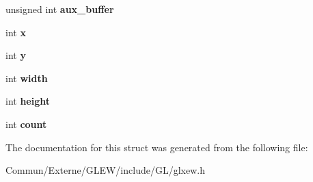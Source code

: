 \begin{DoxyCompactItemize}
\item 
unsigned int {\bfseries aux\+\_\+buffer}\hypertarget{struct_g_l_x_pbuffer_clobber_event_a13193b6e7e3e52b15f754fe91403b7ec}{}\label{struct_g_l_x_pbuffer_clobber_event_a13193b6e7e3e52b15f754fe91403b7ec}

\item 
int {\bfseries x}\hypertarget{struct_g_l_x_pbuffer_clobber_event_a8f0a7162a033c89ee94ce535580dbc32}{}\label{struct_g_l_x_pbuffer_clobber_event_a8f0a7162a033c89ee94ce535580dbc32}

\item 
int {\bfseries y}\hypertarget{struct_g_l_x_pbuffer_clobber_event_a69eb7ac60d36ac3ec4550ac206cfc61f}{}\label{struct_g_l_x_pbuffer_clobber_event_a69eb7ac60d36ac3ec4550ac206cfc61f}

\item 
int {\bfseries width}\hypertarget{struct_g_l_x_pbuffer_clobber_event_aaca375fecb872c73c60cd5d0bfc7c7a5}{}\label{struct_g_l_x_pbuffer_clobber_event_aaca375fecb872c73c60cd5d0bfc7c7a5}

\item 
int {\bfseries height}\hypertarget{struct_g_l_x_pbuffer_clobber_event_aed4e539c896bdad15217bf92c28f8520}{}\label{struct_g_l_x_pbuffer_clobber_event_aed4e539c896bdad15217bf92c28f8520}

\item 
int {\bfseries count}\hypertarget{struct_g_l_x_pbuffer_clobber_event_a61e9f6b31738464dca67f909fcacd298}{}\label{struct_g_l_x_pbuffer_clobber_event_a61e9f6b31738464dca67f909fcacd298}

\end{DoxyCompactItemize}


The documentation for this struct was generated from the following file\+:\begin{DoxyCompactItemize}
\item 
Commun/\+Externe/\+G\+L\+E\+W/include/\+G\+L/glxew.\+h\end{DoxyCompactItemize}
